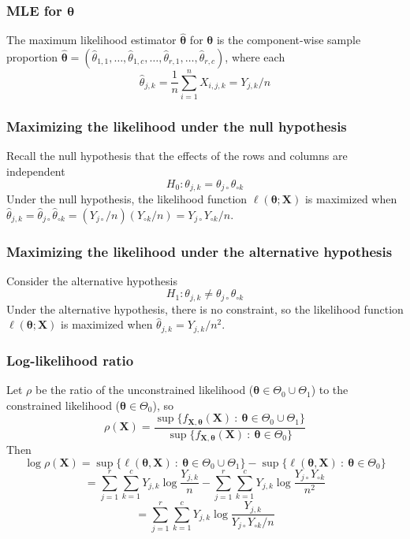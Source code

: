 \documentclass{beamer}
\begin{document}
\begin{frame}
	\frametitle{MLE for $\boldsymbol{\theta}$}
	The maximum likelihood estimator $\boldsymbol{\hat\theta}$ for $\boldsymbol{\theta}$ is the component-wise sample proportion $\boldsymbol{\hat\theta} = (\hat\theta_{1,1}, \ldots, \hat\theta_{1,c}, \ldots, \hat\theta_{r,1}, \ldots, \hat\theta_{r,c})$, where each
	\[\hat\theta_{j,k} = \frac{1}{n}\sum_{i=1}^nX_{i,j,k}=Y_{j,k}/n\]
\end{frame}

\begin{frame}
	\frametitle{Maximizing the likelihood under the null hypothesis}
	Recall the null hypothesis that the effects of the rows and columns are independent
	\[H_0:\theta_{j,k} = \theta_{j\circ}\theta_{\circ k}\]
	Under the null hypothesis, the likelihood function $\ell(\boldsymbol{\theta}; \textbf{X})$ is maximized when $\hat\theta_{j,k} = \hat\theta_{j\circ}\hat\theta_{\circ k} = (Y_{j\circ}/n)(Y_{\circ k}/n) = Y_{j\circ}Y_{\circ k}/n$.
\end{frame}

\begin{frame}
	\frametitle{Maximizing the likelihood under the alternative hypothesis}
	Consider the alternative hypothesis
	\[H_1:\theta_{j,k} \ne \theta_{j\circ}\theta_{\circ k}\]
	Under the alternative hypothesis, there is no constraint, so the likelihood function $\ell(\boldsymbol{\theta}; \textbf{X})$ is maximized when $\hat\theta_{j,k} = Y_{j,k}/n^2$.
\end{frame}

\begin{frame}
	\frametitle{Log-likelihood ratio}
	Let $\rho$ be the ratio of the unconstrained likelihood ($\boldsymbol{\theta}\in\Theta_0\cup\Theta_1$) to the constrained likelihood ($\boldsymbol{\theta}\in\Theta_0$), so
	\[\rho(\textbf{X}) = \frac{\sup\{f_{\textbf{X}, \boldsymbol{\theta}} (\textbf{X})\ :\ \boldsymbol{\theta}\in \Theta_0\cup\Theta_1\}}{\sup\{f_{\textbf{X}, \boldsymbol{\theta}} (\textbf{X})\ :\ \boldsymbol{\theta}\in \Theta_0\}}\]
	Then
	\[\log\rho(\textbf{X}) = \sup\{\ell(\boldsymbol{\theta}, \textbf{X})\ :\ \boldsymbol{\theta}\in\Theta_0\cup\Theta_1\} - \sup\{\ell(\boldsymbol{\theta}, \textbf{X})\ :\ \boldsymbol{\theta}\in\Theta_0\}\]
	\[=\sum_{j=1}^r\sum_{k=1}^cY_{j,k}\log \frac{Y_{j,k}}{n} - \sum_{j=1}^r\sum_{k=1}^cY_{j,k}\log \frac{Y_{j\circ}Y_{\circ k}}{n^2}\]
	\[=\sum_{j=1}^r\sum_{k=1}^cY_{j,k}\log\frac{Y_{j,k}}{Y_{j\circ}Y_{\circ k}/n}\]
\end{frame}
\end{document}
